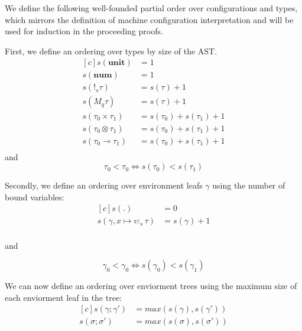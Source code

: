 \begin{definition}[Orderings]\label{def:orderings}
  We define the following well-founded partial order over configurations and
  types, which mirrors the definition of machine configuration interpretation
  and will be used for induction in the proceeding proofs.

  First, we define an ordering over types by size of the AST.
  \begin{equation}
    \begin{aligned}[c]
      s(\textbf{unit}) &= 1 \\
      s(\textbf{num}) &= 1 \\
      s(!_s \tau) &= s(\tau) + 1 \\
      s(M_q \tau) &= s(\tau) + 1 \\
      s(\tau_0 \times \tau_1) &= s(\tau_0) + s(\tau_1) + 1 \\
      s(\tau_0 \otimes \tau_1) &= s(\tau_0) + s(\tau_1) + 1 \\
      s(\tau_0 \multimap \tau_1) &= s(\tau_0) + s(\tau_1) + 1 \\
    \end{aligned}
  \end{equation}
  and
  \begin{equation}
    \tau_0 < \tau_0 \iff s(\tau_0) < s(\tau_1)
  \end{equation}

  Secondly, we define an ordering over environment leafs $\gamma$ using the number of bound
  variables:
  \begin{equation}
    \begin{aligned}[c]
      s(.) &= 0 \\
      s(\gamma, x \mapsto v :_s \tau) &= s(\gamma) + 1 \\
    \end{aligned}
  \end{equation}

  and

  \begin{equation}
    \gamma_0 < \gamma_0 \iff s(\gamma_0) < s(\gamma_1)
  \end{equation}

  We can now define an ordering over enviorment trees using the maximum size of
  each enviorment leaf in the tree:
  \begin{equation}
    \begin{aligned}[c]
      s(\gamma; \gamma') &= max(s(\gamma), s(\gamma')) \\
      s(\sigma; \sigma') &= max(s(\sigma), s(\sigma'))
    \end{aligned}
  \end{equation}


\end{definition}
